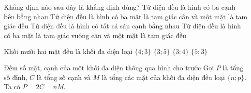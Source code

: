 \begin{ex}%
	Khẳng định nào sau đây là khẳng định đúng?
	\choice
	{Tứ diện đều là hình có ba cạnh bên bằng nhau}
	{Tứ diện đều là hình có ba mặt là tam giác cân và một mặt là tam giác đều}
	{\True Tứ diện đều là hình có tất cả sáu cạnh bằng nhau}
	{Tứ diện đều là hình có ba mặt là tam giác vuông cân và một mặt là tam giác đều}
\end{ex}
\begin{ex}%
	Khối mười hai mặt đều là khối đa diện loại
	\choice
	{$\{4;3\}$}
	{$\{3;5\}$}
	{$\{3;4\}$}
	{\True $\{5;3\}$}
\end{ex}
\begin{dang}{Đếm số mặt, cạnh của một khối đa diện thông qua hình cho trước}
	Gọi $P$ là tổng số đỉnh, $C$ là tổng số cạnh và $M$ là tổng các mặt của khối đa diện đều loại $\{n;p\}$. Ta có $P=2C=nM$.
\end{dang}
